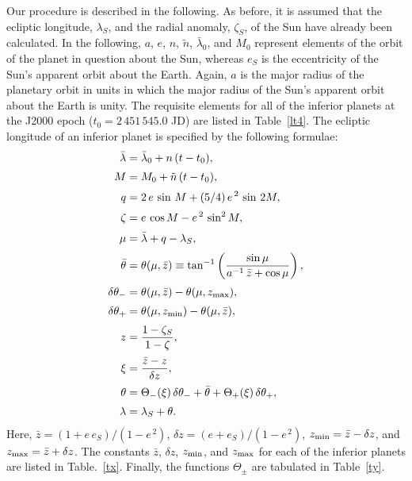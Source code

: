 Our procedure  is described in the following. As before, it is assumed that the ecliptic longitude, $\lambda_S$, and the
radial anomaly, $\zeta_S$, of the Sun have already been calculated.
In the following, $a$, $e$, $n$, $\tilde{n}$, $\bar{\lambda}_0$, and $M_0$ represent  elements of the orbit of the planet in question
about the Sun, whereas  $e_S$ is the eccentricity 
of the Sun's apparent orbit about the Earth.
Again, $a$ is the major radius of the planetary orbit in
units in which the major radius of the Sun's apparent orbit about the
Earth is unity. The requisite elements for all of the inferior planets at the J2000 epoch ($t_0=2\,451\,545.0$ JD)
are listed in Table~\ref{lt4}. The ecliptic longitude of an inferior planet
is specified by the following formulae:
\begin{align}
\bar{\lambda}&=  \bar{\lambda}_0+ n\,(t-t_0) ,\\[0.5ex]
M &= M_{0}  +\tilde{n}\,(t-t_0),\\[0.5ex]
q&= 2\,e\,\sin \,M + (5/4)\,e^{\,2}\,\sin\,2M,\\[0.5ex]
\zeta &= e\,\cos M - e^{\,2}\,\sin^2 M,\\[0.5ex]
\mu&= \bar{\lambda}+q-\lambda_S,\\[0.5ex]
\bar{\theta} &= \theta(\mu,\bar{z})\equiv \tan^{-1} \left(\frac{\sin\mu}{a^{-1}\,\bar{z}+\cos\mu}\right),\\[0.5ex]
\delta\theta_- &= \theta(\mu,\bar{z}) - \theta(\mu,z_{\rm max}),\\[0.5ex]
\delta\theta_+&= \theta(\mu,z_{\rm min}) - \theta(\mu,\bar{z}),\\[0.5ex]
z &= \frac{1-\zeta_S}{1-\zeta},\label{e182x}\\[0.5ex]
\xi &= \frac{\bar{z}-z}{\delta z},\\[0.5ex]
\theta  &=\Theta_-(\xi)\,\delta\theta_-+ \bar{\theta}
+ \Theta_+(\xi)\,\delta\theta_+,\\[0.5ex]
\lambda &=\lambda_S+ \theta.
\end{align}
Here, $\bar{z} = (1+e\,e_S)/(1-e^{\,2})$, $\delta z = (e+e_S)/(1-e^{\,2})$, $z_{\rm min} = \bar{z}-\delta z$,
and $z_{\rm max} = \bar{z}+\delta z$. The constants $\bar{z}$, $\delta z$, $z_{\rm min}$, and $z_{\rm max}$ 
for  each of the inferior planets are listed in Table.~\ref{tx}. Finally, the functions $\Theta_\pm$ are tabulated in Table~\ref{ty}.


